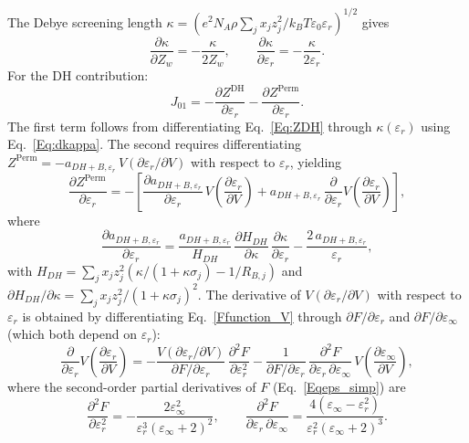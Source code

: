 The Debye screening length $\kappa = \left(e^2 N_A\rho\sum_j x_j z_j^2 /
k_BT\varepsilon_0\varepsilon_r\right)^{1/2}$ gives
\begin{equation}
  \frac{\partial\kappa}{\partial Z_w} = -\frac{\kappa}{2Z_w}, \qquad
  \frac{\partial\kappa}{\partial\varepsilon_r} = -\frac{\kappa}{2\varepsilon_r}.
  \label{Eq:dkappa}
\end{equation}
For the DH contribution:
\begin{equation}
  J_{01} = -\frac{\partial Z^{\text{DH}}}{\partial\varepsilon_r}
           - \frac{\partial Z^{\text{Perm}}}{\partial\varepsilon_r}.
  \label{Eq:J01}
\end{equation}
The first term follows from differentiating Eq.~\eqref{Eq:ZDH} through
$\kappa(\varepsilon_r)$ using Eq.~\eqref{Eq:dkappa}.  The second requires
differentiating $Z^{\text{Perm}} = -a_{DH+B,\varepsilon_r}\,V(\partial\varepsilon_r/\partial V)$
with respect to $\varepsilon_r$, yielding
\begin{equation}
  \frac{\partial Z^{\text{Perm}}}{\partial\varepsilon_r} =
    -\left[\frac{\partial a_{DH+B,\varepsilon_r}}{\partial\varepsilon_r}\,V\!\left(\frac{\partial\varepsilon_r}{\partial V}\right)
    + a_{DH+B,\varepsilon_r}\,\frac{\partial}{\partial\varepsilon_r}
      V\!\left(\frac{\partial\varepsilon_r}{\partial V}\right)\right],
  \label{Eq:dZPerm_der}
\end{equation}
where
\begin{equation}
  \frac{\partial a_{DH+B,\varepsilon_r}}{\partial\varepsilon_r}
  = \frac{a_{DH+B,\varepsilon_r}}{H_{DH}}\,
    \frac{\partial H_{DH}}{\partial\kappa}\,
    \frac{\partial\kappa}{\partial\varepsilon_r}
    - \frac{2\,a_{DH+B,\varepsilon_r}}{\varepsilon_r},
  \label{Eq:daDHBder}
\end{equation}
with $H_{DH} = \sum_j x_j z_j^2\!\left(\kappa/(1+\kappa\sigma_j) - 1/R_{B,j}\right)$
and $\partial H_{DH}/\partial\kappa = \sum_j x_j z_j^2/(1+\kappa\sigma_j)^2$.
The derivative of $V(\partial\varepsilon_r/\partial V)$ with respect to $\varepsilon_r$
is obtained by differentiating Eq.~\eqref{Ffunction_V} through $\partial F/\partial\varepsilon_r$
and $\partial F/\partial\varepsilon_\infty$ (which both depend on $\varepsilon_r$):
\begin{equation}
  \frac{\partial}{\partial\varepsilon_r}V\!\left(\frac{\partial\varepsilon_r}{\partial V}\right)
  = -\frac{V(\partial\varepsilon_r/\partial V)}{\partial F/\partial\varepsilon_r}\,
     \frac{\partial^2 F}{\partial\varepsilon_r^2}
  - \frac{1}{\partial F/\partial\varepsilon_r}\,
    \frac{\partial^2 F}{\partial\varepsilon_r\,\partial\varepsilon_\infty}\,
    V\!\left(\frac{\partial\varepsilon_\infty}{\partial V}\right),
  \label{Eq:d_VderdV_der}
\end{equation}
where the second-order partial derivatives of $F$ (Eq.~\eqref{Eqeps_simp}) are
\begin{equation}
  \frac{\partial^2 F}{\partial\varepsilon_r^2}
  = -\frac{2\varepsilon_\infty^2}{\varepsilon_r^3(\varepsilon_\infty+2)^2}, \qquad
  \frac{\partial^2 F}{\partial\varepsilon_r\,\partial\varepsilon_\infty}
  = \frac{4(\varepsilon_\infty - \varepsilon_r^2)}{\varepsilon_r^2(\varepsilon_\infty+2)^3}.
  \label{Eq:d2F}
\end{equation}

